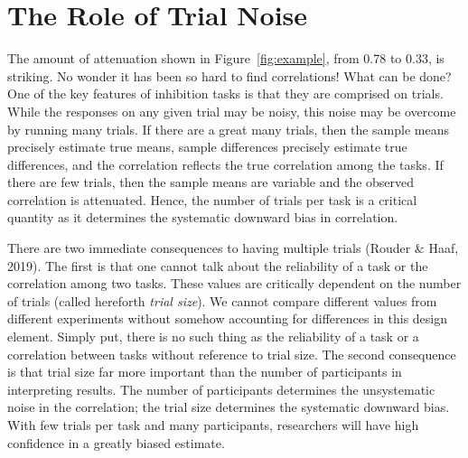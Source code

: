 \documentclass[
  ,man]{apa6}
\begin{document}
\hypertarget{the-role-of-trial-noise}{%
\section{The Role of Trial Noise}\label{the-role-of-trial-noise}}

The amount of attenuation shown in Figure~\ref{fig:example}, from 0.78 to 0.33, is striking. No wonder it has been so hard to find correlations! What can be done?\\
One of the key features of inhibition tasks is that they are comprised on trials. While the responses on any given trial may be noisy, this noise may be overcome by running many trials. If there are a great many trials, then the sample means precisely estimate true means, sample differences precisely estimate true differences, and the correlation reflects the true correlation among the tasks. If there are few trials, then the sample means are variable and the observed correlation is attenuated. Hence, the number of trials per task is a critical quantity as it determines the systematic downward bias in correlation.

There are two immediate consequences to having multiple trials (Rouder \& Haaf, 2019). The first is that one cannot talk about the reliability of a task or the correlation among two tasks. These values are critically dependent on the number of trials (called hereforth \emph{trial size}). We cannot compare different values from different experiments without somehow accounting for differences in this design element. Simply put, there is no such thing as the reliability of a task or a correlation between tasks without reference to trial size. The second consequence is that trial size far more important than the number of participants in interpreting results. The number of participants determines the unsystematic noise in the correlation; the trial size determines the systematic downward bias. With few trials per task and many participants, researchers will have high confidence in a greatly biased estimate.
\end{document}
